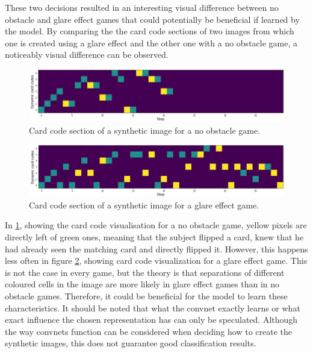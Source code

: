 These two decisions resulted in an interesting visual difference between no obstacle and glare effect games that could potentially be beneficial if learned by the model. By comparing the the card code sections of two images from which one is created using a glare effect and the other one with a no obstacle game, a noticeably visual difference can be observed. 
\begin{figure}[H]
	\centering
	\includegraphics[width=13.6cm]{images/cardCodesNoObst.png}
	\caption[Card code section of a synthetic image for a no obstacle game.]{Card code section of a synthetic image for a no obstacle game.}
	\label{fig:ccNoObst}
\end{figure}
\begin{figure}[H]
	\centering
	\includegraphics[width=13.6cm]{images/cardCodesGlare.png}
	\caption[Card code section of a synthetic image for a glare effect game.]{Card code section of a synthetic image for a glare effect game.}
	\label{fig:ccGlareEffect}
\end{figure}
In \ref{fig:ccNoObst}, showing the card code visualisation for a no obstacle game, yellow pixels are directly left of green ones, meaning that the subject flipped a card, knew that he had already seen the matching card and directly flipped it. However, this happens less often in figure \ref{fig:ccGlareEffect}, showing card code visualization for a glare effect game. This is not the case in every game, but the theory is that separations of different coloured cells in the image are more likely in glare effect games than in no obstacle games. Therefore, it could be beneficial for the model to learn these characteristics. It should be noted that what the convnet exactly learns or what exact influence the chosen representation has can only be speculated. Although the way convnets function can be considered when deciding how to create the synthetic images, this does not guarantee good classification results.

